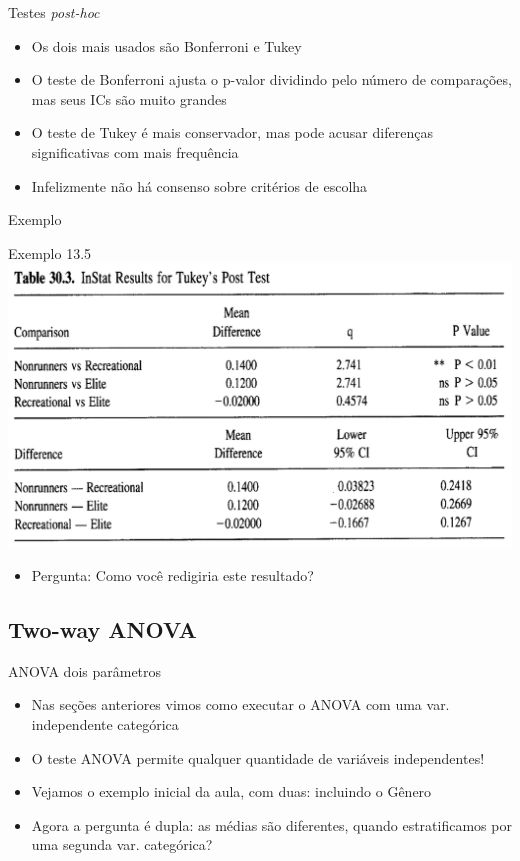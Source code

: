 \documentclass{beamer}
\begin{document}
\begin{frame}{Testes {\em post-hoc}}
  \begin{itemize}
  \item Os dois mais usados são Bonferroni e Tukey
 \item O teste de Bonferroni ajusta o p-valor dividindo pelo número de comparações, mas seus ICs são muito grandes
 \item O teste de Tukey é mais conservador, mas pode acusar diferenças significativas com mais frequência
 \item Infelizmente não há consenso sobre critérios de escolha
  \end{itemize}
\end{frame}

\begin{frame}{Exemplo}
  \begin{exampleblock}{Exemplo 13.5}
    \includegraphics[width=\textwidth]{Cap13-30/exemplo13_5-4}
    \begin{itemize}
    \item Pergunta: Como você redigiria este resultado?
    \end{itemize}
  \end{exampleblock}
\end{frame}

\subsection{Two-way ANOVA}

\begin{frame}{ANOVA dois parâmetros}
  \begin{itemize}
  \item Nas seções anteriores vimos como executar o ANOVA com uma var. independente categórica
  \item O teste ANOVA permite qualquer quantidade de variáveis independentes!
  \item Vejamos o exemplo inicial da aula, com duas: incluindo o Gênero
  \item Agora a pergunta é dupla: as médias são diferentes, quando estratificamos por uma segunda var. categórica?
  \end{itemize}
\end{frame}
\end{document}
